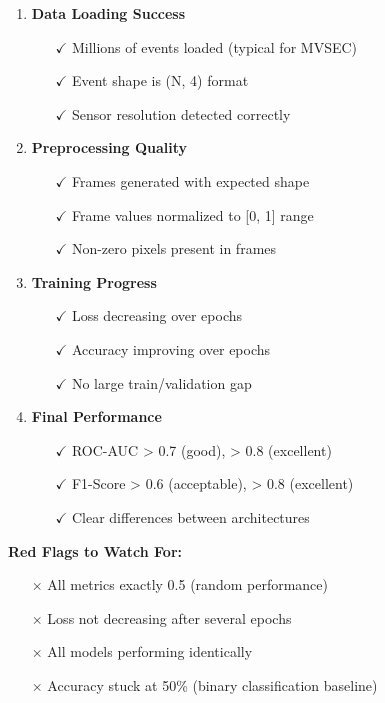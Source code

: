 \documentclass[12pt,a4paper]{article}
\begin{document}
\begin{enumerate}
    \item \textbf{Data Loading Success}
    \begin{itemize}
        \item[$\checkmark$] Millions of events loaded (typical for MVSEC)
        \item[$\checkmark$] Event shape is (N, 4) format
        \item[$\checkmark$] Sensor resolution detected correctly
    \end{itemize}

    \item \textbf{Preprocessing Quality}
    \begin{itemize}
        \item[$\checkmark$] Frames generated with expected shape
        \item[$\checkmark$] Frame values normalized to [0, 1] range
        \item[$\checkmark$] Non-zero pixels present in frames
    \end{itemize}

    \item \textbf{Training Progress}
    \begin{itemize}
        \item[$\checkmark$] Loss decreasing over epochs
        \item[$\checkmark$] Accuracy improving over epochs
        \item[$\checkmark$] No large train/validation gap
    \end{itemize}

    \item \textbf{Final Performance}
    \begin{itemize}
        \item[$\checkmark$] ROC-AUC > 0.7 (good), > 0.8 (excellent)
        \item[$\checkmark$] F1-Score > 0.6 (acceptable), > 0.8 (excellent)
        \item[$\checkmark$] Clear differences between architectures
    \end{itemize}
\end{enumerate}

\textbf{Red Flags to Watch For:}
\begin{itemize}
    \item[$\times$] All metrics exactly 0.5 (random performance)
    \item[$\times$] Loss not decreasing after several epochs
    \item[$\times$] All models performing identically
    \item[$\times$] Accuracy stuck at 50\% (binary classification baseline)
\end{itemize}
\end{document}
